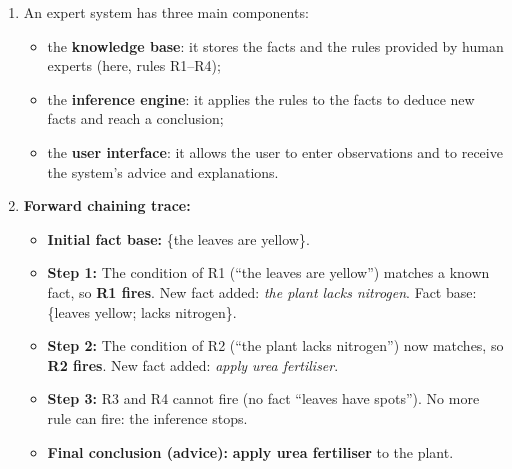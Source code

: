 \documentclass[11pt]{article}
\begin{document}
\begin{corrige}
\begin{enumerate}
\item An expert system has three main components:
\begin{itemize}
\item the \textbf{knowledge base}: it stores the facts and the rules provided by human experts (here, rules R1--R4);
\item the \textbf{inference engine}: it applies the rules to the facts to deduce new facts and reach a conclusion;
\item the \textbf{user interface}: it allows the user to enter observations and to receive the system's advice and explanations.
\end{itemize}
\item \textbf{Forward chaining trace:}
\begin{itemize}
\item \textbf{Initial fact base:} \{the leaves are yellow\}.
\item \textbf{Step 1:} The condition of R1 (``the leaves are yellow'') matches a known fact, so \textbf{R1 fires}. New fact added: \emph{the plant lacks nitrogen}. Fact base: \{leaves yellow; lacks nitrogen\}.
\item \textbf{Step 2:} The condition of R2 (``the plant lacks nitrogen'') now matches, so \textbf{R2 fires}. New fact added: \emph{apply urea fertiliser}.
\item \textbf{Step 3:} R3 and R4 cannot fire (no fact ``leaves have spots''). No more rule can fire: the inference stops.
\item \textbf{Final conclusion (advice):} \textbf{apply urea fertiliser} to the plant.
\end{itemize}
\end{enumerate}
\end{corrige}
\end{document}
